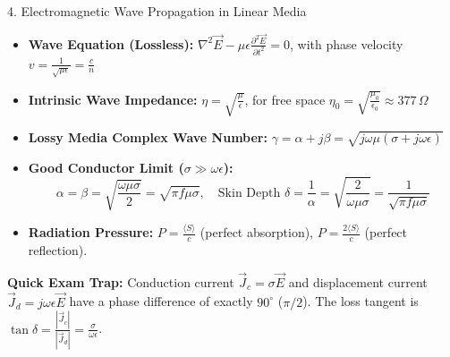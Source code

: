\begin{formulabox}{4. Electromagnetic Wave Propagation in Linear Media}
\begin{itemize}[leftmargin=*,itemsep=2pt]
    \item \textbf{Wave Equation (Lossless):} $\nabla^2 \vec{E} - \mu\epsilon \frac{\partial^2\vec{E}}{\partial t^2} = 0$, with phase velocity $v = \frac{1}{\sqrt{\mu\epsilon}} = \frac{c}{n}$
    \item \textbf{Intrinsic Wave Impedance:} $\eta = \sqrt{\frac{\mu}{\epsilon}}$, for free space $\eta_0 = \sqrt{\frac{\mu_0}{\epsilon_0}} \approx 377\,\Omega$
    \item \textbf{Lossy Media Complex Wave Number:} $\gamma = \alpha + j\beta = \sqrt{j\omega\mu(\sigma + j\omega\epsilon)}$
    \item \textbf{Good Conductor Limit ($\sigma \gg \omega\epsilon$):}
    \[
    \alpha = \beta = \sqrt{\frac{\omega\mu\sigma}{2}} = \sqrt{\pi f \mu \sigma}, \quad \text{Skin Depth } \delta = \frac{1}{\alpha} = \sqrt{\frac{2}{\omega\mu\sigma}} = \frac{1}{\sqrt{\pi f \mu \sigma}}
    \]
    \item \textbf{Radiation Pressure:} $P = \frac{\langle S \rangle}{c}$ (perfect absorption), $P = \frac{2\langle S \rangle}{c}$ (perfect reflection).
\end{itemize}
\end{formulabox}

\begin{memorytip}
\textbf{Quick Exam Trap:} Conduction current $\vec{J}_c = \sigma \vec{E}$ and displacement current $\vec{J}_d = j\omega\epsilon \vec{E}$ have a phase difference of exactly $90^\circ$ ($\pi/2$). The loss tangent is $\tan\delta = \frac{|\vec{J}_c|}{|\vec{J}_d|} = \frac{\sigma}{\omega\epsilon}$.
\end{memorytip}
